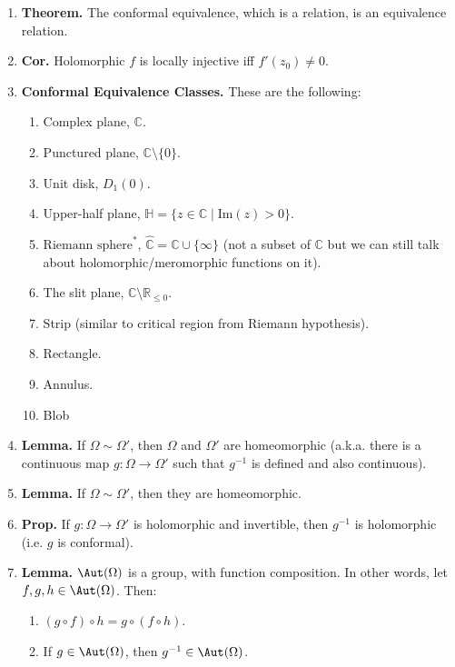 \begin{enumerate}
\begin{enumerate}
    \end{enumerate}
    \item \textbf{Theorem. } The conformal equivalence, which is a relation, is an equivalence relation. 
    \item \textbf{Cor. } Holomorphic $f$ is locally injective iff $f'(z_0) \neq 0$.  
    \item \textbf{Conformal Equivalence Classes. } These are the following: 
    \begin{enumerate}
        \item Complex plane, $\mathbb{C}$. 
        \item Punctured plane, $\mathbb{C} \setminus \{0\}$. 
        \item Unit disk, $D_1(0)$. 
        \item Upper-half plane, $\mathbb{H} = \{z \in \mathbb{C} \mid \textrm{Im}(z) > 0\}$. 
        \item $\textrm{Riemann sphere}^*$, $\hat{\mathbb{C}} = \mathbb{C} \cup \{\infty\}$ (not a subset of $\mathbb{C}$ but we can still talk about holomorphic/meromorphic functions on it). 
        \item The slit plane, $\mathbb{C} \setminus \mathbb{R}_{\leq 0}$. 
        \item Strip (similar to critical region from Riemann hypothesis). 
        \item Rectangle. 
        \item Annulus. 
        \item Blob
    \end{enumerate}
    \item \textbf{Lemma. } If $\Omega \sim \Omega'$, then $\Omega$ and $\Omega'$ are homeomorphic (a.k.a. there is a continuous map $g: \Omega \to \Omega'$ such that $g^{-1}$ is defined and also continuous). 
    \item \textbf{Lemma. } If $\Omega \sim \Omega'$, then they are homeomorphic. 
    \item \textbf{Prop. } If $g: \Omega \to \Omega'$ is holomorphic and invertible, then $g^{-1}$ is holomorphic (i.e. $g$ is conformal). 
    \item \textbf{Lemma. } $\Aut(\Omega)$ is a group, with function composition. In other words, let $f,g,h \in \Aut(\Omega)$. Then: 
    \begin{enumerate}
        \item $(g \circ f) \circ h = g \circ (f \circ h)$. 
        \item If $g \in \Aut(\Omega)$, then $g^{-1} \in \Aut(\Omega)$. 

\end{enumerate}
\end{enumerate}
